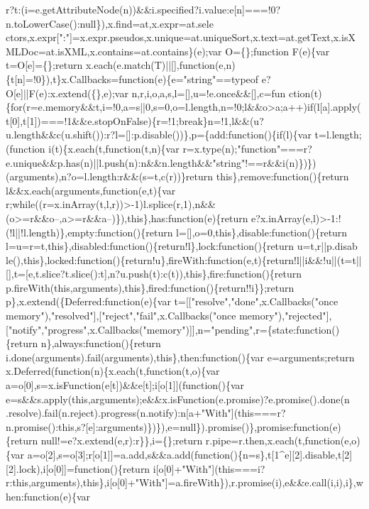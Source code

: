 \begin{DoxyCode}
{      r?t:(i=e.getAttributeNode(n))&&i.specified?i.value:e[n]===!0?n.toLowerCase():null\}),x.find=at,x.expr=at.sele
      ctors,x.expr[":"]=x.expr.pseudos,x.unique=at.uniqueSort,x.text=at.getText,x.isXMLDoc=at.isXML,x.contains=at.contains\}(e);var O=\{\};function F(e)\{var t=O[e]=\{\};return
       x.each(e.match(T)||[],function(e,n)\{t[n]=!0\}),t\}x.Callbacks=function(e)\{e="string"==typeof e?O[e]||F(e):x.extend(\{\},e);var
       n,r,i,o,a,s,l=[],u=!e.once&&[],c=fun
      ction(t)\{for(r=e.memory&&t,i=!0,a=s||0,s=0,o=l.length,n=!0;l&&o>a;a++)if(l[a].apply(t[0],t[1])===!1&&e.stopOnFalse)\{r=!1;break\}n=!1,l&&(u?u.length&&c(u.shift()):r?l=[]:p.disable())\},p=\{add:function()\{if(l)\{var
       t=l.length;(function i(t)\{x.each(t,function(t,n)\{var
       r=x.type(n);"function"===r?e.unique&&p.has(n)||l.push(n):n&&n.length&&"string"!==r&&i(n)\})\})(arguments),n?o=l.length:r&&(s=t,c(r))\}return this\},remove:function()\{return
       l&&x.each(arguments,function(e,t)\{var
       r;while((r=x.inArray(t,l,r))>-1)l.splice(r,1),n&&(o>=r&&o--,a>=r&&a--)\}),this\},has:function(e)\{return e?x.inArray(e,l)>-1:!(!l||!l.length)\},empty:function()\{return
       l=[],o=0,this\},disable:function()\{return l=u=r=t,this\},disabled:function()\{return!l\},lock:function()\{return
       u=t,r||p.disab
      le(),this\},locked:function()\{return!u\},fireWith:function(e,t)\{return!l||i&&!u||(t=t||[],t=[e,t.slice?t.slice():t],n?u.push(t):c(t)),this\},fire:function()\{return
       p.fireWith(this,arguments),this\},fired:function()\{return!!i\}\};return p\},x.extend(\{Deferred:function(e)\{var t=[["resolve","done",x.Callbacks("once
       memory"),"resolved"],["reject","fail",x.Callbacks("once
       memory"),"rejected"],["notify","progress",x.Callbacks("memory")]],n="pending",r=\{state:function()\{return n\},always:function()\{return
       i.done(arguments).fail(arguments),this\},then:function()\{var e=arguments;return x.Deferred(function(n)\{x.each(t,function(t,o)\{var
       a=o[0],s=x.isFunction(e[t])&&e[t];i[o[1]](function()\{var
       e=s&&s.apply(this,arguments);e&&x.isFunction(e.promise)?e.promise().done(n
      .resolve).fail(n.reject).progress(n.notify):n[a+"With"](this===r?n.promise():this,s?[e]:arguments)\})\}),e=null\}).promise()\},promise:function(e)\{return null!=e?x.extend(e,r):r\}\},i=\{\};return
       r.pipe=r.then,x.each(t,function(e,o)\{var
       a=o[2],s=o[3];r[o[1]]=a.add,s&&a.add(function()\{n=s\},t[1^e][2].disable,t[2][2].lock),i[o[0]]=function()\{return
       i[o[0]+"With"](this===i?r:this,arguments),this\},i[o[0]+"With"]=a.fireWith\}),r.promise(i),e&&e.call(i,i),i\},when:function(e)\{var
}
\end{DoxyCode}
